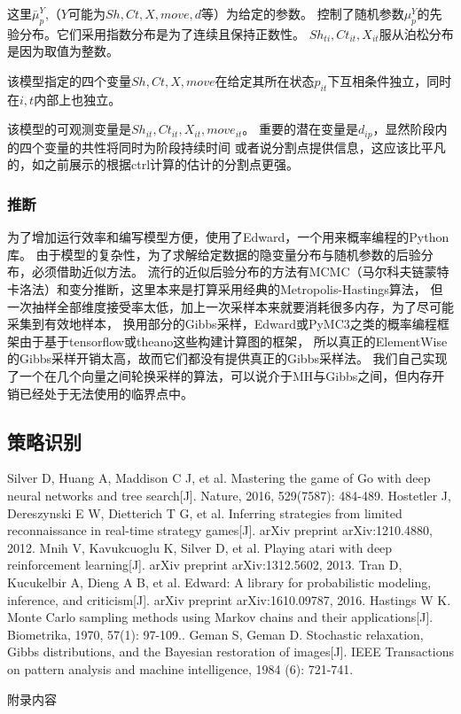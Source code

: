 \documentclass[UTF8]{ctexart}
\begin{document}
这里$\bar{\mu}^{Y}_{p}$,（$Y$可能为$Sh,Ct,X,move,d$等）为给定的参数。
控制了随机参数$\mu^{Y}_p$的先验分布。它们采用指数分布是为了连续且保持正数性。
$Sh_{ti},Ct_{it},X_{it}$服从泊松分布是因为取值为整数。

该模型指定的四个变量$Sh,Ct,X,move$在给定其所在状态$p_{it}$下互相条件独立，同时在$i,t$内部上也独立。

该模型的可观测变量是$Sh_{it},Ct_{it},X_{it},move_{it}$。
重要的潜在变量是$d_{ip}$，显然阶段内的四个变量的共性将同时为阶段持续时间
或者说分割点提供信息，这应该比平凡的，如之前展示的根据ctrl计算的估计的分割点更强。


\subsubsection{推断}


为了增加运行效率和编写模型方便，使用了Edward，一个用来概率编程的Python库\cite{edward}。
由于模型的复杂性，为了求解给定数据的隐变量分布与随机参数的后验分布，必须借助近似方法。
流行的近似后验分布的方法有MCMC（马尔科夫链蒙特卡洛法）和变分推断，这里本来是打算采用经典的Metropolis-Hastings算法，
\cite{metropolis}
但一次抽样全部维度接受率太低，加上一次采样本来就要消耗很多内存，为了尽可能采集到有效地样本，
换用部分的Gibbs采样\cite{gibbs}，Edward或PyMC3之类的概率编程框架由于基于tensorflow或theano这些构建计算图的框架，
所以真正的ElementWise的Gibbs采样开销太高，故而它们都没有提供真正的Gibbs采样法。
我们自己实现了一个在几个向量之间轮换采样的算法，可以说介于MH与Gibbs之间，但内存开销已经处于无法使用的临界点中。


\subsection{策略识别}

\begin{thebibliography}{9}%
  Silver D, Huang A, Maddison C J, et al. Mastering the game of Go with deep neural networks and tree search[J]. Nature, 2016, 529(7587): 484-489. 	
  Hostetler J, Dereszynski E W, Dietterich T G, et al. Inferring strategies from limited reconnaissance in real-time strategy games[J]. arXiv preprint arXiv:1210.4880, 2012.
  Mnih V, Kavukcuoglu K, Silver D, et al. Playing atari with deep reinforcement learning[J]. arXiv preprint arXiv:1312.5602, 2013.
  Tran D, Kucukelbir A, Dieng A B, et al. Edward: A library for probabilistic modeling, inference, and criticism[J]. arXiv preprint arXiv:1610.09787, 2016.
  Hastings W K. Monte Carlo sampling methods using Markov chains and their applications[J]. Biometrika, 1970, 57(1): 97-109..
  Geman S, Geman D. Stochastic relaxation, Gibbs distributions, and the Bayesian restoration of images[J]. IEEE Transactions on pattern analysis and machine intelligence, 1984 (6): 721-741.
\end{thebibliography}

\newpage
\appendix
附录内容
\end{document}
